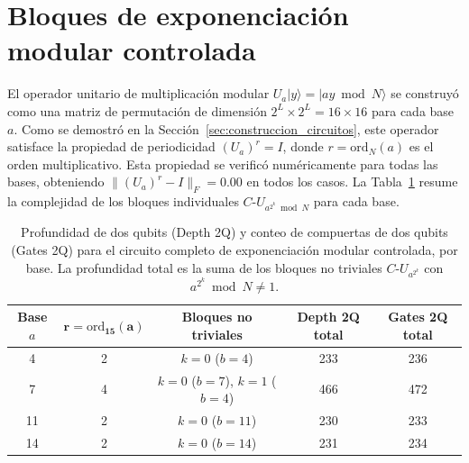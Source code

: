 \documentclass[12pt, spanish]{book}
\begin{document}
\section{Bloques de exponenciación modular controlada}

El operador unitario de multiplicación modular $U_a |y\rangle = |ay \bmod N\rangle$ se construyó como una matriz de permutación de dimensión $2^L \times 2^L = 16 \times 16$ para cada base $a$. Como se demostró en la Sección~\ref{sec:construccion_circuitos}, este operador satisface la propiedad de periodicidad $(U_a)^r = I$, donde $r = \mathrm{ord}_N(a)$ es el orden multiplicativo. Esta propiedad se verificó numéricamente para todas las bases, obteniendo $\|(U_a)^r - I\|_F = 0.00$ en todos los casos. La Tabla~\ref{tab:exp_mod_bloques} resume la complejidad de los bloques individuales $C$-$U_{a^{2^k} \bmod N}$ para cada base.

\begin{table}[H]
    \centering
    \caption{Profundidad de dos qubits (Depth 2Q) y conteo de compuertas de dos qubits (Gates 2Q) para el circuito completo de exponenciación modular controlada, por base. La profundidad total es la suma de los bloques no triviales $C$-$U_{a^{2^k}}$ con $a^{2^k} \bmod N \neq 1$.\\}
    \label{tab:exp_mod_bloques}
    \begin{tabular}{ccccc}
        \hline
        \textbf{Base $a$} & $\boldsymbol{r = \mathrm{ord}_{15}(a)}$ & \textbf{Bloques no triviales}        & \textbf{Depth 2Q total} & \textbf{Gates 2Q total} \\
        \hline
        4                 & 2                                       & $k = 0$ ($b = 4$)                    & 233                     & 236                     \\
        7                 & 4                                       & $k = 0$ ($b = 7$), $k = 1$ ($b = 4$) & 466                     & 472                     \\
        11                & 2                                       & $k = 0$ ($b = 11$)                   & 230                     & 233                     \\
        14                & 2                                       & $k = 0$ ($b = 14$)                   & 231                     & 234                     \\
        \hline
    \end{tabular}
\end{table}
\end{document}
